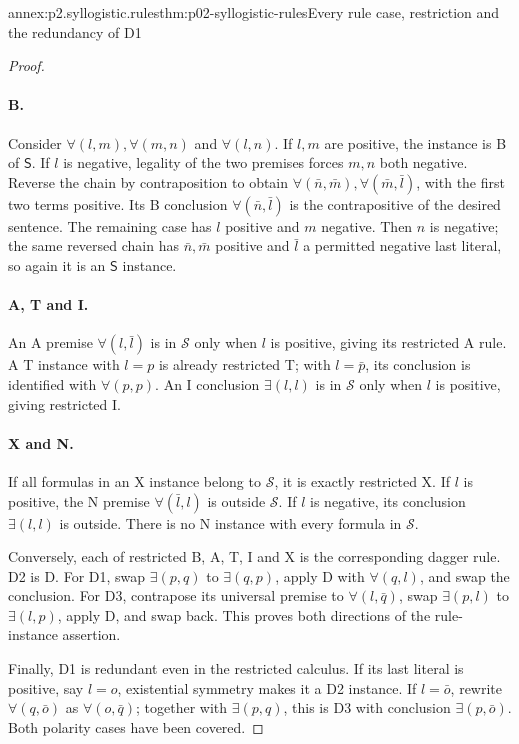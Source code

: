 \begin{annexitem}{annex:p2.syllogistic.rules}{thm:p02-syllogistic-rules}{Every rule case, restriction and the redundancy of D1}
\begin{proof}
\paragraph{B.}
Consider \(\forall(l,m),\forall(m,n)\) and \(\forall(l,n)\).
If \(l,m\) are positive, the instance is B of \(\mathsf S\).
If \(l\) is negative, legality of the two premises forces \(m,n\) both
negative. Reverse the chain by contraposition to obtain
\(\forall(\bar n,\bar m),\forall(\bar m,\bar l)\), with the first two
terms positive. Its B conclusion \(\forall(\bar n,\bar l)\) is the
contrapositive of the desired sentence. The remaining case has \(l\)
positive and \(m\) negative. Then \(n\) is negative; the same reversed
chain has \(\bar n,\bar m\) positive and \(\bar l\) a permitted negative
last literal, so again it is an \(\mathsf S\) instance.

\paragraph{A, T and I.}
An A premise \(\forall(l,\bar l)\) is in \(\mathcal S\) only when \(l\)
is positive, giving its restricted A rule. A T instance with \(l=p\) is
already restricted T; with \(l=\bar p\), its conclusion is identified with
\(\forall(p,p)\). An I conclusion \(\exists(l,l)\) is in \(\mathcal S\)
only when \(l\) is positive, giving restricted I.

\paragraph{X and N.}
If all formulas in an X instance belong to \(\mathcal S\), it is exactly
restricted X. If \(l\) is positive, the N premise
\(\forall(\bar l,l)\) is outside \(\mathcal S\). If \(l\) is negative,
its conclusion \(\exists(l,l)\) is outside. There is no N instance with
every formula in \(\mathcal S\).

Conversely, each of restricted B, A, T, I and X is the corresponding
dagger rule. D2 is D. For D1, swap \(\exists(p,q)\) to
\(\exists(q,p)\), apply D with \(\forall(q,l)\), and swap the conclusion.
For D3, contrapose its universal premise to \(\forall(l,\bar q)\), swap
\(\exists(p,l)\) to \(\exists(l,p)\), apply D, and swap back.
This proves both directions of the rule-instance assertion.

Finally, D1 is redundant even in the restricted calculus. If its last literal
is positive, say \(l=o\), existential symmetry makes it a D2 instance.
If \(l=\bar o\), rewrite \(\forall(q,\bar o)\) as
\(\forall(o,\bar q)\); together with \(\exists(p,q)\), this is D3 with
conclusion \(\exists(p,\bar o)\). Both polarity cases have been covered.
\end{proof}
\end{annexitem}

